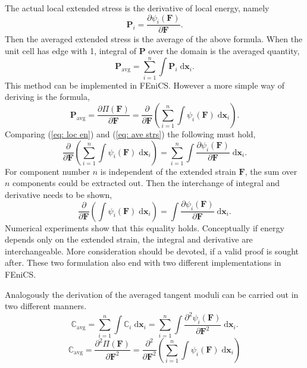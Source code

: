 \documentclass[10pt,a4paper]{scrreprt}
\newcommand{\myd}{\;\mathrm{d}}
\begin{document}
The actual local extended stress is the derivative of local energy, namely
\begin{equation}
\label{eq: loc en}
\mathbf{P}_{i} = \dfrac{\partial \psi_{i}(\mathbf{F})}{\partial \mathbf{F}}.
\end{equation}
Then the averaged extended stress is the average of the above formula. When the unit cell has edge with 1, integral of $\mathbf{P}$ over the domain is the averaged quantity,
\begin{equation}
\label{eq: ave strs}
\mathbf{P}_{\text{avg}} = \sum^{n}_{i=1} \int \mathbf{P}_{i} \myd{\mathbf{x}_{i}}.
\end{equation}
This method can be implemented in FEniCS. However a more simple way of deriving is the formula,
\begin{equation}
\label{eq: ave strs 2}
\mathbf{P}_{\text{avg}} = \dfrac{\partial \Pi(\mathbf{F})}{\partial \mathbf{F}} = \dfrac{\partial}{\partial \mathbf{F}} \left( \sum^{n}_{i=1} \int \psi_{i}(\mathbf{F}) \myd{\mathbf{x}_{i}} \right).
\end{equation}
Comparing (\ref{eq: loc en}) and (\ref{eq: ave strs}) the following must hold,
\begin{equation}
\label{eq: equality}
\dfrac{\partial}{\partial \mathbf{F}} \left( \sum^{n}_{i=1} \int \psi_{i}(\mathbf{F}) \myd{\mathbf{x}_{i}} \right) = \sum^{n}_{i=1} \int \dfrac{\partial \psi_{i}(\mathbf{F})}{\partial \mathbf{F}} \myd{\mathbf{x}_{i}}.
\end{equation}
For component number $n$ is independent of the extended strain $\mathbf{F}$, the sum over $n$ components could be extracted out. Then the interchange of integral and derivative needs to be shown, 
\begin{equation}
\label{eq: interchange}
\dfrac{\partial}{\partial \mathbf{F}} \left( \int \psi_{i}(\mathbf{F}) \myd{\mathbf{x}_{i}} \right) = \int \dfrac{\partial \psi_{i}(\mathbf{F})}{\partial \mathbf{F}} \myd{\mathbf{x}_{i}}.
\end{equation}
Numerical experiments show that this equality holds. Conceptually if energy depends only on the extended strain, the integral and derivative are interchangeable. More consideration should be devoted, if a valid proof is sought after. These two formulation also end with two different implementations in FEniCS.

Analogously the derivation of the averaged tangent moduli can be carried out in two different manners. 
\begin{equation}
\label{eq: tan mod}
\mathbb{C}_{\text{avg}} = \sum^{n}_{i=1} \int \mathbb{C}_{i} \myd{\mathbf{x}_{i}} = \sum^{n}_{i=1} \int \dfrac{\partial^{2} \psi_{i}(\mathbf{F})}{\partial \mathbf{F}^{2}} \myd{\mathbf{x}_{i}}.
\end{equation}
\begin{equation}
\label{eq: tan mod 2}
\mathbb{C}_{\text{avg}} = \dfrac{\partial^{2} \Pi(\mathbf{F})}{\partial \mathbf{F}^{2}} = \dfrac{\partial^{2}}{\partial \mathbf{F}^{2}} \left( \sum^{n}_{i=1} \int \psi_{i}(\mathbf{F}) \myd{\mathbf{x}_{i}} \right)
\end{equation}
\end{document}
